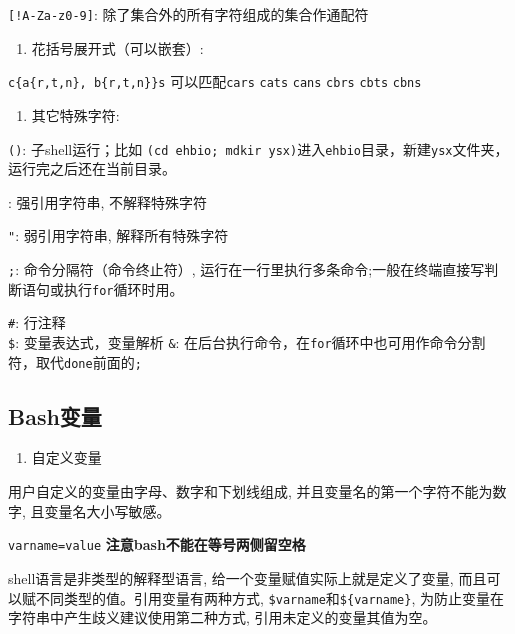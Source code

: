 \documentclass[]{article}
\providecommand{\tightlist}{%
  \setlength{\itemsep}{0pt}\setlength{\parskip}{0pt}}
\numberwithin{figure}{section}
\numberwithin{table}{section}
\begin{document}
\texttt{{[}!A-Za-z0-9{]}}: 除了集合外的所有字符组成的集合作通配符

\begin{enumerate}
\def\labelenumi{\arabic{enumi}.}
\setcounter{enumi}{2}
\tightlist
\item
  花括号展开式（可以嵌套）:
\end{enumerate}

\texttt{c\{a\{r,t,n\},\ b\{r,t,n\}\}s} 可以匹配\texttt{cars} \texttt{cats} \texttt{cans} \texttt{cbrs} \texttt{cbts} \texttt{cbns}

\begin{enumerate}
\def\labelenumi{\arabic{enumi}.}
\setcounter{enumi}{3}
\tightlist
\item
  其它特殊字符:
\end{enumerate}

\texttt{()}: 子shell运行；比如 \texttt{(cd\ ehbio;\ mdkir\ ysx)}进入\texttt{ehbio}目录，新建\texttt{ysx}文件夹，运行完之后还在当前目录。

\texttt{\textquotesingle{}}: 强引用字符串, 不解释特殊字符

\texttt{"}: 弱引用字符串, 解释所有特殊字符

\texttt{;}: 命令分隔符（命令终止符）, 运行在一行里执行多条命令;一般在终端直接写判断语句或执行\texttt{for}循环时用。

\texttt{\#}: 行注释\\
\texttt{\$}: 变量表达式，变量解析
\texttt{\&}: 在后台执行命令，在\texttt{for}循环中也可用作命令分割符，取代\texttt{done}前面的\texttt{;}

\hypertarget{bash_variable}{%
\subsection{Bash变量}\label{bash_variable}}

\begin{enumerate}
\def\labelenumi{\arabic{enumi}.}
\tightlist
\item
  自定义变量
\end{enumerate}

用户自定义的变量由字母、数字和下划线组成, 并且变量名的第一个字符不能为数字, 且变量名大小写敏感。

\texttt{varname=value} \textbf{注意bash不能在等号两侧留空格}

shell语言是非类型的解释型语言, 给一个变量赋值实际上就是定义了变量, 而且可以赋不同类型的值。引用变量有两种方式, \texttt{\$varname}和\texttt{\$\{varname\}}, 为防止变量在字符串中产生歧义建议使用第二种方式, 引用未定义的变量其值为空。
\end{document}
